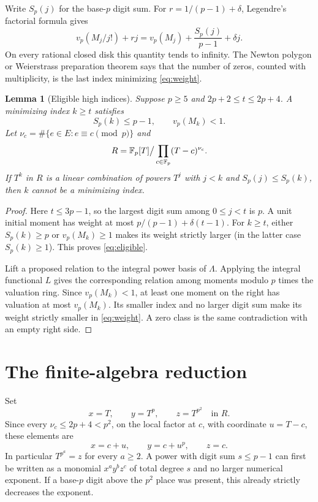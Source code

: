\documentclass[11pt]{article}
\newtheorem{lemma}[theorem]{Lemma}
\theoremstyle{remark}\newtheorem{remark}[theorem]{Remark}
\begin{document}
Write $S_p(j)$ for the base-$p$ digit sum. For $r=1/(p-1)+\delta$, Legendre's factorial formula gives
\begin{equation}\label{eq:weight}
 v_p(M_j/j!)+rj=v_p(M_j)+\frac{S_p(j)}{p-1}+\delta j.
\end{equation}
On every rational closed disk this quantity tends to infinity. The Newton polygon or Weierstrass preparation theorem says that the number of zeros, counted with multiplicity, is the last index minimizing \eqref{eq:weight}.

\begin{lemma}[Eligible high indices]\label{lem:eligible}
Suppose $p\ge5$ and $2p+2\le t\le2p+4$. A minimizing index $k\ge t$ satisfies
\begin{equation}\label{eq:eligible}
 S_p(k)\le p-1,\qquad v_p(M_k)<1.
\end{equation}
Let $\nu_c=\#\{e\in E:e\equiv c\pmod p\}$ and
\[
 R=\mathbb F_p[T]\big/\prod_{c\in\mathbb F_p}(T-c)^{\nu_c}.
\]
If $T^k$ in $R$ is a linear combination of powers $T^j$ with $j<k$ and $S_p(j)\le S_p(k)$, then $k$ cannot be a minimizing index.
\end{lemma}
\begin{proof}
Here $t\le3p-1$, so the largest digit sum among $0\le j<t$ is $p$. A unit initial moment has weight at most $p/(p-1)+\delta(t-1)$. For $k\ge t$, either $S_p(k)\ge p$ or $v_p(M_k)\ge1$ makes its weight strictly larger (in the latter case $S_p(k)\ge1$). This proves \eqref{eq:eligible}.

Lift a proposed relation to the integral power basis of $\Lambda$. Applying the integral functional $L$ gives the corresponding relation among moments modulo $p$ times the valuation ring. Since $v_p(M_k)<1$, at least one moment on the right has valuation at most $v_p(M_k)$. Its smaller index and no larger digit sum make its weight strictly smaller in \eqref{eq:weight}. A zero class is the same contradiction with an empty right side.
\end{proof}

\section{The finite-algebra reduction}
Set
\[
 x=T,\qquad y=T^p,\qquad z=T^{p^2}\quad\text{in }R.
\]
Since every $\nu_c\le2p+4<p^2$, on the local factor at $c$, with coordinate $u=T-c$, these elements are
\begin{equation}\label{eq:local}
 x=c+u,\qquad y=c+u^p,\qquad z=c.
\end{equation}
In particular $T^{p^a}=z$ for every $a\ge2$. A power with digit sum $s\le p-1$ can first be written as a monomial $x^a y^b z^c$ of total degree $s$ and no larger numerical exponent. If a base-$p$ digit above the $p^2$ place was present, this already strictly decreases the exponent.
\end{document}
